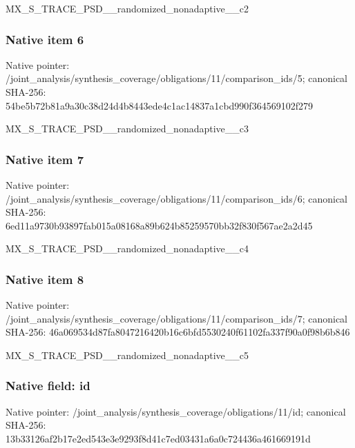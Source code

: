 \documentclass[10pt,a4paper]{article}
\begin{document}
\begingroup\raggedright\sloppy MX\_\allowbreak{}S\_\allowbreak{}TRACE\_\allowbreak{}PSD\_\allowbreak{}\_\allowbreak{}randomized\_\allowbreak{}nonadaptive\_\allowbreak{}\_\allowbreak{}c2\par\endgroup

\subsubsection{Native item 6}
Native pointer: /joint\_\allowbreak{}analysis/synthesis\_\allowbreak{}coverage/obligations/11/comparison\_\allowbreak{}ids/5; canonical SHA-256: 54be5b72b81a9a30c38d24d4b8443ede4c1ac14837a1cbd990f364569102f279

\begingroup\raggedright\sloppy MX\_\allowbreak{}S\_\allowbreak{}TRACE\_\allowbreak{}PSD\_\allowbreak{}\_\allowbreak{}randomized\_\allowbreak{}nonadaptive\_\allowbreak{}\_\allowbreak{}c3\par\endgroup

\subsubsection{Native item 7}
Native pointer: /joint\_\allowbreak{}analysis/synthesis\_\allowbreak{}coverage/obligations/11/comparison\_\allowbreak{}ids/6; canonical SHA-256: 6ed11a9730b93897fab015a08168a89b624b85259570bb32f830f567ae2a2d45

\begingroup\raggedright\sloppy MX\_\allowbreak{}S\_\allowbreak{}TRACE\_\allowbreak{}PSD\_\allowbreak{}\_\allowbreak{}randomized\_\allowbreak{}nonadaptive\_\allowbreak{}\_\allowbreak{}c4\par\endgroup

\subsubsection{Native item 8}
Native pointer: /joint\_\allowbreak{}analysis/synthesis\_\allowbreak{}coverage/obligations/11/comparison\_\allowbreak{}ids/7; canonical SHA-256: 46a069534d87fa8047216420b16c6bfd5530240f61102fa337f90a0f98b6b846

\begingroup\raggedright\sloppy MX\_\allowbreak{}S\_\allowbreak{}TRACE\_\allowbreak{}PSD\_\allowbreak{}\_\allowbreak{}randomized\_\allowbreak{}nonadaptive\_\allowbreak{}\_\allowbreak{}c5\par\endgroup

\subsubsection{Native field: id}
Native pointer: /joint\_\allowbreak{}analysis/synthesis\_\allowbreak{}coverage/obligations/11/id; canonical SHA-256: 13b33126af2b17e2ed543e3e9293f8d41c7ed03431a6a0c724436a461669191d
\end{document}
